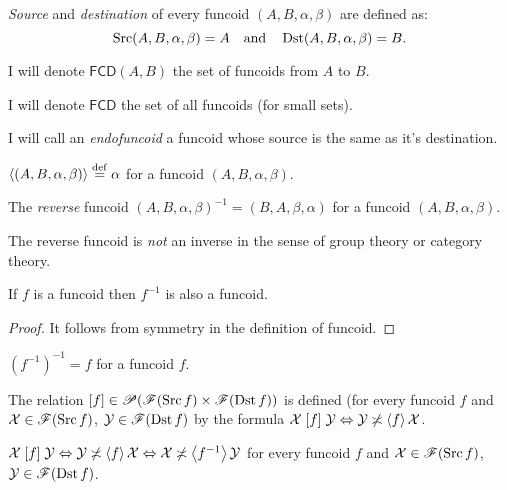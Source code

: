 \begin{defn}
\emph{Source} and
\emph{destination} of every funcoid $(A,B,\alpha,\beta)$ are defined
as:
\[
\operatorname{Src}(A,B,\alpha,\beta)=A\quad\text{and}\quad\operatorname{Dst}(A,B,\alpha,\beta)=B.
\]

\end{defn}
I will denote $\mathsf{FCD}(A,B)$ the set of funcoids from $A$ to
$B$.

I will denote $\mathsf{FCD}$ the set of all funcoids (for small sets).
\begin{defn}
I will call an \emph{endofuncoid} a funcoid whose source is the same as it's destination.
\end{defn}

\begin{defn}
$\left\langle (A,B,\alpha,\beta)\right\rangle\overset{\mathrm{def}}{=}\alpha$ for a funcoid $(A,B,\alpha,\beta)$.
\end{defn}

\begin{defn}
The \emph{reverse} funcoid
$(A,B,\alpha,\beta)^{-1}=(B,A,\beta,\alpha)$
for a funcoid $(A,B,\alpha,\beta)$.\end{defn}
\begin{note}
The reverse funcoid is \emph{not} an inverse in the sense of group
theory or category theory.\end{note}
\begin{prop}
If $f$ is a funcoid then $f^{-1}$ is also a funcoid.\end{prop}
\begin{proof}
It follows from symmetry in the definition of funcoid.\end{proof}
\begin{obvious}
$(f^{-1})^{-1}=f$ for a funcoid $f$.\end{obvious}
\begin{defn}
The relation $\mathord{\mathrel{\left[f\right]}}\in\mathscr{P}(\mathscr{F}(\operatorname{Src}
f)\times\mathscr{F}(\operatorname{Dst} f))$
is defined (for every funcoid $f$ and $\mathcal{X}\in\mathscr{F}(\operatorname{Src} f)$,
$\mathcal{Y}\in\mathscr{F}(\operatorname{Dst} f)$ by the formula $\mathcal{X}\mathrel{\left[f\right]}\mathcal{Y}\Leftrightarrow\mathcal{Y}\not\asymp\left\langle f\right\rangle\mathcal{X}$.\end{defn}
\begin{obvious}
$\mathcal{X}\mathrel{\left[f\right]}\mathcal{Y}\Leftrightarrow\mathcal{Y}\not\asymp\left\langle f\right\rangle\mathcal{X}\Leftrightarrow\mathcal{X}\not\asymp\left\langle f^{-1}\right\rangle\mathcal{Y}$
for every funcoid $f$ and $\mathcal{X}\in\mathscr{F}(\operatorname{Src} f)$,
$\mathcal{Y}\in\mathscr{F}(\operatorname{Dst} f)$.
\end{obvious}

